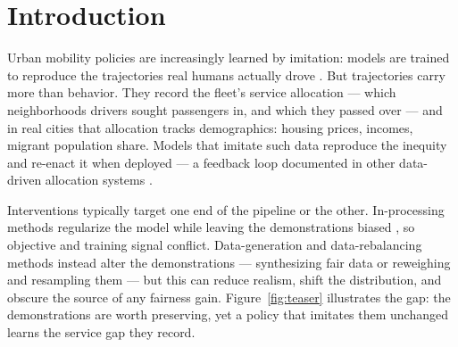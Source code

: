 \section{Introduction}\label{sec:intro}

Urban mobility policies are increasingly learned by imitation: models are
trained to reproduce the trajectories real humans actually
drove \cite{zhang2022cgail}. But trajectories carry more than behavior.
They record the fleet's service allocation --- which neighborhoods drivers
sought passengers in, and which they passed over --- and in real cities
that allocation tracks demographics: housing prices, incomes, migrant
population share. Models that imitate such data reproduce the inequity and
re-enact it when deployed --- a feedback loop documented in other
data-driven allocation systems \cite{ensign2018,lumisaac2016}.

Interventions typically target one end of the pipeline or the other.
In-processing methods regularize the model while leaving the demonstrations
biased \cite{zheng2023}, so objective and training signal conflict.
Data-generation and data-rebalancing methods instead alter the
demonstrations --- synthesizing fair data
\cite{xu2018fairgan,vanbreugel2021decaf} or reweighing and resampling them
\cite{kamirancalders2012} --- but this can reduce realism, shift the
distribution, and obscure the source of any fairness gain.
Figure~\ref{fig:teaser} illustrates the gap: the demonstrations are worth
preserving, yet a policy that imitates them unchanged learns the service gap
they record.

